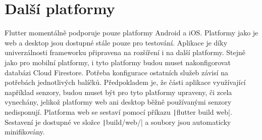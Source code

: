 \section{Další platformy}

Flutter momentálně podporuje pouze platformy Android a iOS.
Platformy jako je web a desktop jsou dostupné stále pouze pro testování.
Aplikace je díky univerzálnosti frameworku připravena na rozšíření i na další
platformy.
Stejně jako pro mobilní platformy,
i tyto platformy budou muset nakonfigorovat databázi Cloud Firestore.
Potřeba konfigurace ostatních služeb závisí na potřebách jednotlivých balíčků.
Předpokladem je,
že části aplikace využívající například senzory,
budou muset být pro tyto platformy upraveny,
či zcela vynechány,
jelikož platformy web ani desktop běžně používanými senzory nedisponují.
Platforma web se sestaví pomocí příkazu \texttt|flutter build web|.
Sestavení je dostupné ve složce \texttt|build/web/|
a soubory jsou automaticky minifikovány.
\cite{flutter_deploy_web}
